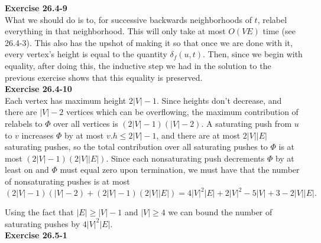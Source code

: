 \documentclass{article}
\begin{document}
\noindent\textbf{Exercise 26.4-9}\\

What we should do is to, for successive backwards neighborhoods of $t$, relabel everything in that neighborhood. This will only take at most $O(VE)$ time (see 26.4-3). This also has the upshot of making it so that once we are done with it, every vertex's height is equal to the quantity $\delta_f(u,t)$. Then, since we begin with equality, after doing this, the inductive step we had in the solution to the previous exercise shows that this equality is preserved.\\

\noindent\textbf{Exercise 26.4-10}\\

Each vertex has maximum height $2|V| - 1$.  Since heights don't decrease, and there are $|V| - 2$ vertices which can be overflowing, the maximum contribution of relabels to $\Phi$ over all vertices is $(2|V| - 1)(|V|-2)$.  A saturating push from $u$ to $v$ increases $\Phi$ by at most $v.h \leq 2|V| - 1$, and there are at most $2|V||E|$ saturating pushes, so the total contribution over all saturating pushes to $\Phi$ is at most $(2|V| - 1)(2|V||E|)$.  Since each nonsaturating push decrements $\Phi$ by at least on and $\Phi$ must equal zero upon termination, we must have that the number of nonsaturating pushes is at most
\[ (2|V| - 1)(|V|-2) + (2|V| - 1)(2|V||E|) = 4|V|^2 |E| + 2|V|^2 - 5|V| + 3 - 2|V||E|.\]

Using the fact that $|E| \geq |V| - 1$ and $|V| \geq 4$ we can bound the number of saturating pushes by $4|V|^2|E|$. \\

\noindent\textbf{Exercise 26.5-1}\\
\end{document}
